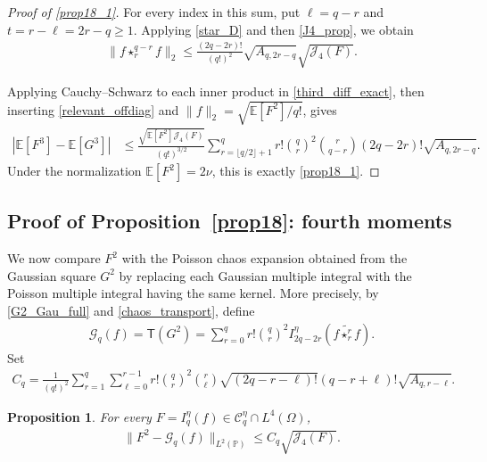 \documentclass[letterpaper,11pt,reqno]{amsart}
\numberwithin{equation}{section}
\theoremstyle{plain}
\newtheorem{proposition}[theorem]{Proposition}
\theoremstyle{definition}
\theoremstyle{remark}
\newcommand{\E}{\mathbb{E}}
\newcommand{\PP}{\mathbb{P}}
\newcommand{\cC}{\mathcal{C}}
\newcommand{\cG}{\mathcal{G}}
\newcommand{\noi}{\noindent}
\newcommand{\Jfour}{\mathcal J_4}
\newcommand{\wt}{\widetilde}
\begin{document}
\begin{proof}[Proof of \eqref{prop18_1}]
For every index in this sum, put $\ell=q-r$ and
$t=r-\ell=2r-q\geq1$.  Applying \eqref{star_D} and then
\eqref{J4_prop}, we obtain
\noi
\begin{align}
 \|f\star_r^{q-r}f\|_2
 \leq
 \frac{(2q-2r)!}{(q!)^2}
 \sqrt{A_{q,2r-q}}\sqrt{\Jfour(F)}.
 \label{relevant_offdiag}
\end{align}

Applying Cauchy--Schwarz to each inner product in
\eqref{third_diff_exact}, then inserting
\eqref{relevant_offdiag} and
$\|f\|_2=\sqrt{\E[F^2]/q!}$, gives
\begin{align*}
 |\E[F^3]-\E[G^3]|
 &\leq
 \frac{\sqrt{\E[F^2]\Jfour(F)}}{(q!)^{3/2}}
 \sum_{r=\lfloor q/2\rfloor+1}^q
 r!\binom qr^2\binom r{q-r}(2q-2r)!
 \sqrt{A_{q,2r-q}}.
\end{align*}
Under the normalization
$\E[F^2]=2\nu$, this is exactly
\eqref{prop18_1}.
\end{proof}
\subsection{Proof of Proposition~\ref{prop18}: fourth moments}
\label{SEC_54}

We now compare $F^2$ with the Poisson chaos expansion
obtained from the Gaussian square $G^2$ by replacing each Gaussian
multiple integral with the Poisson multiple integral having the same
kernel.  More precisely, by
\eqref{G2_Gau_full} and \eqref{chaos_transport}, define
\noi
\begin{align}
 \cG_q(f)
 =\mathsf T(G^2)
 =\sum_{r=0}^q r!\binom qr^2
 I_{2q-2r}^\eta
 \left( f\wt{\star_r^r} f \right).
 \label{Gaussian_skeleton}
\end{align}
Set
\noi
\begin{align}
 C_q
 =\frac1{(q!)^2}
 \sum_{r=1}^q\sum_{\ell=0}^{r-1}
 r!\binom qr^2\binom r\ell
 \sqrt{(2q-r-\ell)!}(q-r+\ell)!
 \sqrt{A_{q,r-\ell}}.
 \label{Cq_def}
\end{align}

\begin{proposition}
\label{prop_square_gauss}
For every $F=I_q^\eta(f)\in\cC_q^\eta\cap L^4(\Omega)$,
\noi
\begin{align}
 \|F^2-\cG_q(f)\|_{L^2(\PP)}
 \leq C_q\sqrt{\Jfour(F)}.
 \label{square_gauss}
\end{align}
\end{proposition}
\end{document}
